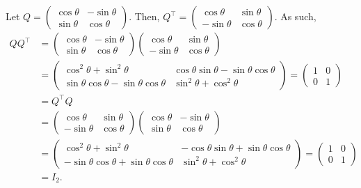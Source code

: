 \documentclass[12pt]{article}
\begin{document}
Let $Q = \begin{pmatrix}
    \cos\theta & -\sin\theta \\
    \sin\theta & \cos\theta
\end{pmatrix}$. Then, $Q^\top = \begin{pmatrix}
    \cos\theta & \sin\theta \\
    -\sin\theta & \cos\theta
\end{pmatrix}$. As such,
\begin{align*}
    QQ^\top &= \begin{pmatrix}
        \cos\theta & -\sin\theta \\
        \sin\theta & \cos\theta
    \end{pmatrix}\begin{pmatrix}
        \cos\theta & \sin\theta \\
        -\sin\theta & \cos\theta
    \end{pmatrix}
    \\
    &= \begin{pmatrix}
        \cos^2\theta + \sin^2\theta & \cos\theta\sin\theta - \sin\theta\cos\theta \\
        \sin\theta\cos\theta - \sin\theta\cos\theta & \sin^2\theta + \cos^2\theta
    \end{pmatrix}
    = \begin{pmatrix}
        1 & 0 \\
        0 & 1
    \end{pmatrix}
    \\
    &= Q^\top Q \\
    &= \begin{pmatrix}
        \cos\theta & \sin\theta \\
        -\sin\theta & \cos\theta
    \end{pmatrix}\begin{pmatrix}
        \cos\theta & -\sin\theta \\
        \sin\theta & \cos\theta
    \end{pmatrix} \\
    &= \begin{pmatrix}
        \cos^2\theta + \sin^2\theta & -\cos\theta\sin\theta + \sin\theta\cos\theta \\
        -\sin\theta\cos\theta + \sin\theta\cos\theta & \sin^2\theta + \cos^2\theta
    \end{pmatrix}
    = \begin{pmatrix}
        1 & 0 \\
        0 & 1
    \end{pmatrix} \\
    &= I_2.
\end{align*}
\end{document}
